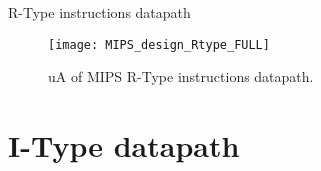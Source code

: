 \documentclass[]{slides}
\begin{document}
% 
\begin{frame}{R-Type instructions datapath}
\vspace{-6.22pt}
  \begin{figure}
  \centering
  \texttt{[image: MIPS\_design\_Rtype\_FULL]}
  \vspace{-3pt}
  \caption{\ac{uA} of \ac{MIPS} R-Type instructions datapath.}
  \label{Figure:non_pipelined_MIPS_Rtype_FULL}
  \end{figure}
\end{frame}

\section{I-Type datapath}
% 
\end{document}
